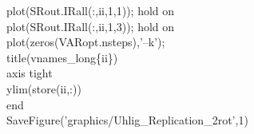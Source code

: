 \hspace{1mm}\hspace{5mm} \hspace{5mm} \hspace{5mm} \hspace{5mm} plot(SRout.IRall(:,ii,1,1)); hold on \\ 
\hspace{1mm}\hspace{5mm} \hspace{5mm} \hspace{5mm} \hspace{5mm} plot(SRout.IRall(:,ii,1,3)); hold on \\ 
\hspace{1mm}\hspace{5mm} \hspace{5mm} \hspace{5mm} \hspace{5mm} plot(zeros(VARopt.nsteps),\textcolor{matlabpurple}{'--k'}); \\ 
\hspace{1mm}\hspace{5mm} \hspace{5mm} \hspace{5mm} \hspace{5mm} title(vnames\_long\{ii\}) \\ 
\hspace{1mm}\hspace{5mm} \hspace{5mm} \hspace{5mm} \hspace{5mm} axis tight \\ 
\hspace{1mm}\hspace{5mm} \hspace{5mm} \hspace{5mm} \hspace{5mm} ylim(store(ii,:)) \\ 
\hspace{1mm}\hspace{5mm} \hspace{5mm} \hspace{5mm} \textcolor{matlabblue}{end} \\ 
\hspace{1mm}\hspace{5mm} \hspace{5mm} \hspace{5mm} SaveFigure(\textcolor{matlabpurple}{'graphics/Uhlig\_Replication\_2rot'},1) \\ 
